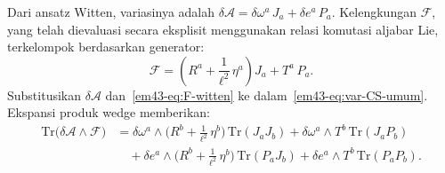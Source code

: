 Dari ansatz Witten, variasinya adalah $\delta\mathcal{A} = \delta\omega^{a}\, J_{a} + \delta e^{a}\, P_{a}$. Kelengkungan $\mathcal{F}$, yang telah dievaluasi secara eksplisit menggunakan relasi komutasi aljabar Lie, terkelompok berdasarkan generator:
\begin{equation}\label{em43-eq:F-witten}
    \mathcal{F}
    = \left(R^{a} + \frac{1}{\ell^{2}}\, \eta^{a}\right) J_{a}
    + T^{a}\, P_{a}.
\end{equation}
Substitusikan $\delta\mathcal{A}$ dan~\eqref{em43-eq:F-witten} ke dalam~\eqref{em43-eq:var-CS-umum}. Ekspansi produk wedge memberikan:
\begin{align}\label{em43-eq:trace-ekspansi}
    \mathrm{Tr}\!\big(\delta\mathcal{A} \wedge \mathcal{F}\big)
    &= \delta\omega^{a} \wedge \big(R^{b}
    + \tfrac{1}{\ell^{2}}\,\eta^{b}\big)\,
    \mathrm{Tr}(J_{a} J_{b})
    + \delta\omega^{a} \wedge T^{b}\,
    \mathrm{Tr}(J_{a} P_{b}) \nonumber \\[4pt]
    &\quad + \delta e^{a} \wedge \big(R^{b}
    + \tfrac{1}{\ell^{2}}\,\eta^{b}\big)\,
    \mathrm{Tr}(P_{a} J_{b})
    + \delta e^{a} \wedge T^{b}\,
    \mathrm{Tr}(P_{a} P_{b}).
\end{align}

